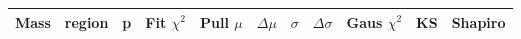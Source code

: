 \def\tableCaption{Statistical quantities for data CR fit}

\begin{table}[!htbp]
   \begin{center}
        \begin{tabular}{ll
            S[round-mode = figures, round-precision = 1]
            S[round-mode = figures, round-precision = 2]|
            S[round-mode = figures, round-precision = 2]
            S[round-mode = figures, round-precision = 2]
            S[round-mode = figures, round-precision = 2]
            S[round-mode = figures, round-precision = 2]
            S[round-mode = figures, round-precision = 2]
            S[round-mode = figures, round-precision = 2]
            S[round-mode = figures, round-precision = 2]
            }
            \toprule
            {Mass} & {region} & {p} & {Fit $\chi^2$} & {Pull $\mu$} & {$\Delta\mu$} & {$\sigma$} & {$\Delta\sigma$} & {Gaus $\chi^2$} & {KS} & {Shapiro}  \\
            \midrule

\end{tabular}
\end{center}
\end{table}
